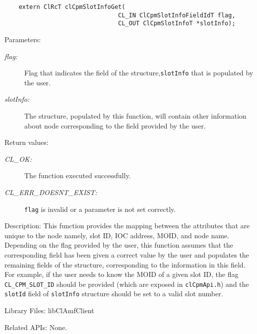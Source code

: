 {\begin{Desc}
\footnotesize\begin{verbatim}    extern ClRcT clCpmSlotInfoGet(
                      			CL_IN ClCpmSlotInfoFieldIdT flag,
                      			CL_OUT ClCpmSlotInfoT *slotInfo);
\end{verbatim}
\normalsize
\end{Desc}
\begin{Desc}
\item[Parameters:]
\begin{description}
\item[{\em flag:}]Flag that indicates the field of the structure,{\tt{slot\-Info}} that is populated by the user. 
\item[{\em slot\-Info:}]The structure, populated by this function, will contain other information about node corresponding to the field provided by the
user.\end{description}
\end{Desc}
\begin{Desc}
\item[Return values:]
\begin{description}
\item[{\em CL\_\-OK:}]The function executed successfully. 
\item[{\em CL\_\-ERR\_\-DOESNT\_\-EXIST:}]{\tt{flag}} is invalid or a parameter is not set correctly. \end{description}
\end{Desc}
\begin{Desc}
\item[Description:]This function provides the mapping between the attributes that are unique to the node namely, slot ID, IOC address, MOID, and node 
name. Depending on the flag provided by the user, this function assumes that the corresponding field has been given a correct value by the user and 
populates the remaining fields of the structure, corresponding to the information in this field. For example, if the user needs to know the MOID of a 
given slot ID, the flag {\tt{CL\_\-CPM\_\-SLOT\_\-ID}} should be provided (which are exposed in {\tt{cl\-Cpm\-Api.h}}) and the {\tt{slot\-Id}} field of 
{\tt{slot\-Info}} structure should be set to a valid slot number.\end{Desc}
\begin{Desc}
\item[Library Files:]lib\-Cl\-Amf\-Client\end{Desc}

\begin{Desc}
\item[Related APIs:]None.\end{Desc}

}
